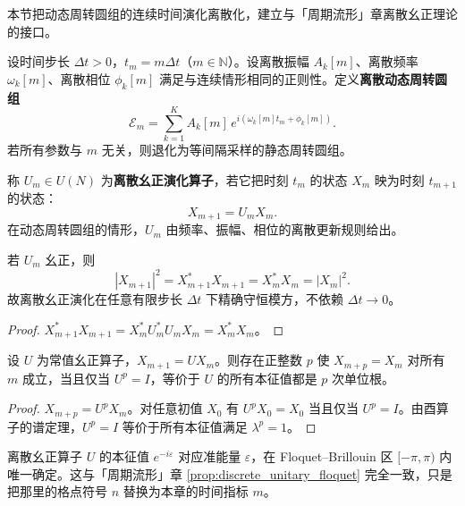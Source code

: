 本节把动态周转圆组的连续时间演化离散化，建立与「周期流形」章离散幺正理论的接口。

\begin{definition}[时间离散化的动态周转圆组]\label{def:dyn_discrete_epicycle}
设时间步长 $\Delta t>0$，$t_m=m\Delta t$（$m\in\mathbb N$）。设离散振幅 $A_k[m]$、离散频率 $\omega_k[m]$、离散相位 $\phi_k[m]$ 满足与连续情形相同的正则性。定义\textbf{离散动态周转圆组}
\[
\mathcal E_m=\sum_{k=1}^{K}A_k[m]\,e^{i(\omega_k[m]t_m+\phi_k[m])}.
\]
若所有参数与 $m$ 无关，则退化为等间隔采样的静态周转圆组。
\end{definition}

\begin{definition}[离散幺正演化算子]\label{def:dyn_discrete_unitary_operator}
称 $U_m\in U(N)$ 为\textbf{离散幺正演化算子}，若它把时刻 $t_m$ 的状态 $X_m$ 映为时刻 $t_{m+1}$ 的状态：
\[
X_{m+1}=U_mX_m.
\]
在动态周转圆组的情形，$U_m$ 由频率、振幅、相位的离散更新规则给出。
\end{definition}

\begin{proposition}[离散幺正演化的模方守恒]\label{prop:dyn_discrete_unitary_norm}
若 $U_m$ 幺正，则
\[
|X_{m+1}|^2=X_{m+1}^\ast X_{m+1}=X_m^\ast X_m=|X_m|^2.
\]
故离散幺正演化在任意有限步长 $\Delta t$ 下精确守恒模方，不依赖 $\Delta t\to 0$。
\end{proposition}

\begin{proof}
$X_{m+1}^\ast X_{m+1}=X_m^\ast U_m^\ast U_mX_m=X_m^\ast X_m$。
\end{proof}

\begin{theorem}[离散幺正演化的周期条件]\label{thm:dyn_discrete_period_condition}
设 $U$ 为常值幺正算子，$X_{m+1}=UX_m$。则存在正整数 $p$ 使 $X_{m+p}=X_m$ 对所有 $m$ 成立，当且仅当 $U^p=I$，等价于 $U$ 的所有本征值都是 $p$ 次单位根。
\end{theorem}

\begin{proof}
$X_{m+p}=U^pX_m$。对任意初值 $X_0$ 有 $U^pX_0=X_0$ 当且仅当 $U^p=I$。由酉算子的谱定理，$U^p=I$ 等价于所有本征值满足 $\lambda^p=1$。
\end{proof}

\begin{corollary}\label{cor:dyn_discrete_floquet}
离散幺正算子 $U$ 的本征值 $e^{-i\varepsilon}$ 对应准能量 $\varepsilon$，在 Floquet–Brillouin 区 $[-\pi,\pi)$ 内唯一确定。这与「周期流形」章 \cref{prop:discrete_unitary_floquet} 完全一致，只是把那里的格点符号 $n$ 替换为本章的时间指标 $m$。
\end{corollary}

